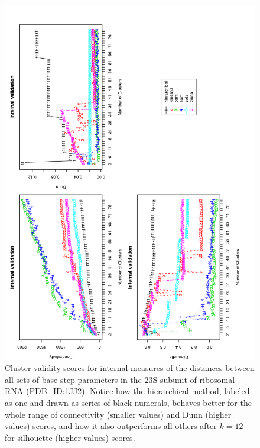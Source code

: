 \begin{figure}
 \centering
\includegraphics[angle=0, scale=0.34]{Chapter2/STval_int.png}
\caption{Cluster  validity   scores  for  internal   measures  of  the
distances between all sets of  base-step parameters in the 23S subunit
of ribosomal  RNA (PDB\_ID:1JJ2). Notice how  the hierarchical method,
labeled as one  and drawn as series of  black numerals, behaves better
for the whole range of  connectivity (smaller values) and Dunn (higher
values) scores,  and how it  also outperforms all others  after $k=12$
for silhouette (higher values) scores.}
 \label{fig:internal}
\end{figure}

